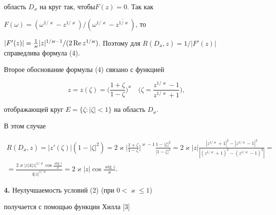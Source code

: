 область $D_{\varkappa}$ на круг так, чтобы\linebreak $F(z)=0$. Так как 


$F(\omega)=(\omega^{1/\varkappa}-z^{1/\varkappa})/


(\omega^{1/\varkappa}-\overline {z^{1/\varkappa}})$, то 


$|F'(z)|=\frac{1}{{\varkappa}}|z|^{1/\varkappa-1}/(


{2\re z^{1/\varkappa}})$. Поэтому для $R({D_{\varkappa},z}) 


= 1/|F'(z)|$ справедлива формула (4).





Второе обоснование формулы (4) связано с функцией


$$


z=z({\zeta})=\bigg({\frac{{1+\zeta}}{{1-\zeta}}} 


\bigg)^{\varkappa} \quad


\bigg({\zeta=\frac{{z^{1/\varkappa}-1}}{{z^{1/\varkappa}+1}}}\bigg),


$$


отображающей круг $E=\{\zeta :|\zeta | < 1\} $ на область $D_{\varkappa}$. 


В этом случае


\begin{gather*}


R({D_{\varkappa},z})=|z'({\zeta} )|({1-|\zeta |^2})=


2\varkappa \bigg| {\frac{{1+\zeta}}{{1-\zeta}}} \bigg|^{\varkappa-1}


\frac{{1-|\zeta |^2}}{{|1-\zeta |^2}}=


2\varkappa |z|\frac{{|z^{1/\varkappa}+1|^2-|z^{1/\varkappa}-


1|^2}}{{|({z^{1/\varkappa}+1})^2-({z^{1/\varkappa}-1})^2|}}= \\


%


=\frac{2\varkappa |z|4|z|^{1/\varkappa}\cos\frac{\arg z}{\varkappa}} 


{{4|z|^{1/\varkappa}}}=2\varkappa |z|\cos\frac{\arg z}{\varkappa}.


\end{gather*}








{\bf 4.} Неулучшаемость условий (2) (при $0 < \varkappa \le 1$) 


получается с помощью функции Хилла [3]


